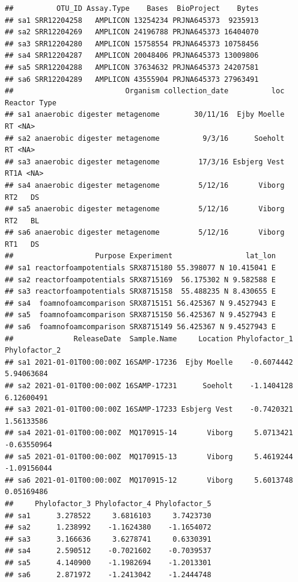 \documentclass[
]{book}
\begin{document}
\begin{verbatim}
##          OTU_ID Assay.Type    Bases  BioProject    Bytes
## sa1 SRR12204258   AMPLICON 13254234 PRJNA645373  9235913
## sa2 SRR12204269   AMPLICON 24196788 PRJNA645373 16404070
## sa3 SRR12204280   AMPLICON 15758554 PRJNA645373 10758456
## sa4 SRR12204287   AMPLICON 20048406 PRJNA645373 13009806
## sa5 SRR12204288   AMPLICON 37634632 PRJNA645373 24207581
## sa6 SRR12204289   AMPLICON 43555904 PRJNA645373 27963491
##                          Organism collection_date          loc Reactor Type
## sa1 anaerobic digester metagenome        30/11/16  Ejby Moelle      RT <NA>
## sa2 anaerobic digester metagenome          9/3/16      Soeholt      RT <NA>
## sa3 anaerobic digester metagenome         17/3/16 Esbjerg Vest    RT1A <NA>
## sa4 anaerobic digester metagenome         5/12/16       Viborg     RT2   DS
## sa5 anaerobic digester metagenome         5/12/16       Viborg     RT2   BL
## sa6 anaerobic digester metagenome         5/12/16       Viborg     RT1   DS
##                   Purpose Experiment                 lat_lon
## sa1 reactorfoampotentials SRX8715180 55.398077 N 10.415041 E
## sa2 reactorfoampotentials SRX8715169  56.175302 N 9.582588 E
## sa3 reactorfoampotentials SRX8715158  55.488235 N 8.430655 E
## sa4  foamnofoamcomparison SRX8715151 56.425367 N 9.4527943 E
## sa5  foamnofoamcomparison SRX8715150 56.425367 N 9.4527943 E
## sa6  foamnofoamcomparison SRX8715149 56.425367 N 9.4527943 E
##              ReleaseDate  Sample.Name     Location Phylofactor_1 Phylofactor_2
## sa1 2021-01-01T00:00:00Z 16SAMP-17236  Ejby Moelle    -0.6074442    5.94063684
## sa2 2021-01-01T00:00:00Z 16SAMP-17231      Soeholt    -1.1404128    6.12600491
## sa3 2021-01-01T00:00:00Z 16SAMP-17233 Esbjerg Vest    -0.7420321    1.56133586
## sa4 2021-01-01T00:00:00Z  MQ170915-14       Viborg     5.0713421   -0.63550964
## sa5 2021-01-01T00:00:00Z  MQ170915-13       Viborg     5.4619244   -1.09156044
## sa6 2021-01-01T00:00:00Z  MQ170915-12       Viborg     5.6013748    0.05169486
##     Phylofactor_3 Phylofactor_4 Phylofactor_5
## sa1      3.278522     3.6816103     3.7423730
## sa2      1.238992    -1.1624380    -1.1654072
## sa3      3.166636     3.6278741     0.6330391
## sa4      2.590512    -0.7021602    -0.7039537
## sa5      4.140900    -1.1982694    -1.2013301
## sa6      2.871972    -1.2413042    -1.2444748
\end{verbatim}
\end{document}
